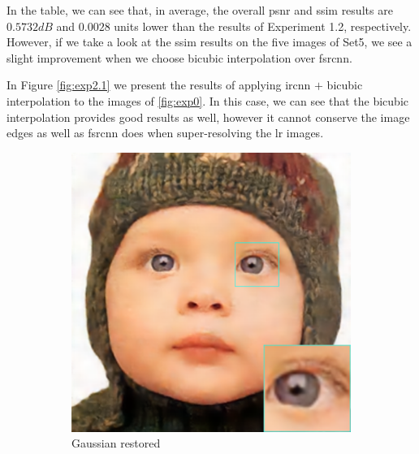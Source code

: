 In the table, we can see that, in average, the overall \gls{psnr} and \gls{ssim} results are $0.5732dB$ and $0.0028$ units lower than the results of Experiment 1.2, respectively. However, if we take a look at the \gls{ssim} results on the five images of Set5, we see a slight improvement when we choose bicubic interpolation over \gls{fsrcnn}.

In Figure \ref{fig:exp2.1} we present the results of applying \gls{ircnn} $+$ bicubic interpolation to the images of \ref{fig:exp0}. In this case, we can see that the bicubic interpolation provides good results as well, however it cannot conserve the image edges as well as \gls{fsrcnn} does when super-resolving the \gls{lr} images.

\begin{figure}
	\centering
	\begin{subfigure}{0.24\textwidth}
		\includegraphics[width=\textwidth]{images/exp2.1/gaussian.png}
		\caption{Gaussian restored}
	\end{subfigure}
	\begin{subfigure}{0.24\textwidth}

\end{subfigure}
\end{figure}
